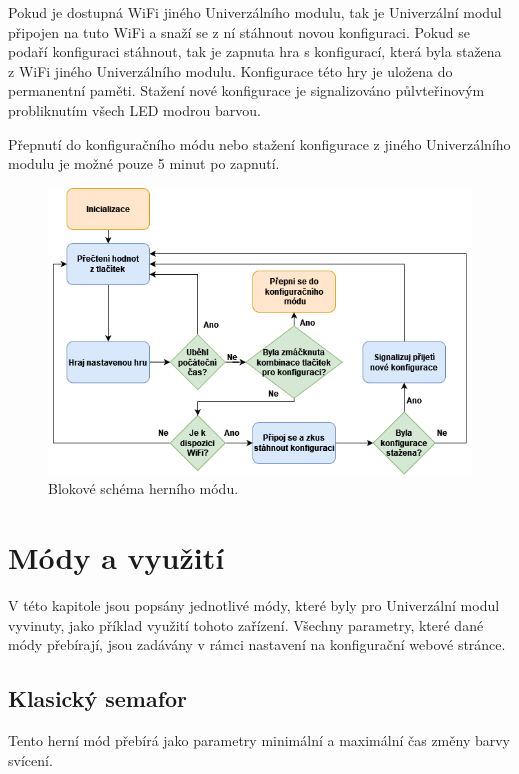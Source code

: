 Pokud je dostupná WiFi jiného Univerzálního modulu, tak je Univerzální modul připojen na tuto WiFi a snaží se z ní stáhnout novou konfiguraci. Pokud se podaří konfiguraci stáhnout, tak je zapnuta hra s konfigurací,
která byla stažena z WiFi jiného Univerzálního modulu. Konfigurace této hry je uložena do permanentní paměti. Stažení nové konfigurace je signalizováno půlvteřinovým probliknutím všech LED modrou barvou. 

Přepnutí do konfiguračního módu nebo stažení konfigurace z jiného Univerzálního modulu je možné pouze 5 minut po zapnutí. 

\begin{figure}[!h]
  \begin{center}
    \includegraphics[scale=0.65]{obrazky/blokove_schema_modu_PLAY.png}
  \end{center}
  \caption[Blokové schéma herního módu]{Blokové schéma herního módu.}
\end{figure}

\chapter{Módy a využití}
V této kapitole jsou popsány jednotlivé módy, které byly pro Univerzální modul vyvinuty, jako příklad využití tohoto zařízení. Všechny parametry, které dané módy přebírají, jsou zadávány 
v rámci nastavení na konfigurační webové stránce.

\section{Klasický semafor}
Tento herní mód přebírá jako parametry minimální a maximální čas změny barvy svícení. 


